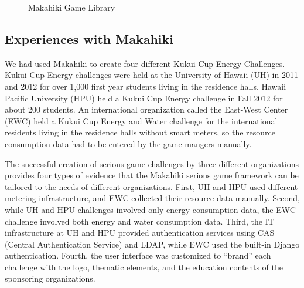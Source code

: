 \documentclass{sigchi}
\begin{document}
\begin{figure}
	\center
		\caption{Makahiki Game Library}
		\label{fig:makahiki-games}
\end{figure}

\subsection{Experiences with Makahiki}

We had used Makahiki to create four different Kukui
Cup Energy Challenges. Kukui Cup Energy challenges were held at the
University of Hawaii (UH) in 2011 and 2012 for over 1,000 first
year students living in the residence halls. Hawaii Pacific University
(HPU) held a Kukui Cup Energy challenge in Fall 2012 for about 200
students. An international organization called the East-West Center
(EWC) held a Kukui Cup Energy and Water challenge for the
international residents living in the residence halls without smart
meters, so the resource consumption data had to be entered by the game
mangers manually.

The successful creation of serious game challenges by three different organizations
provides four types of evidence that the Makahiki serious game framework can be tailored
to the needs of different organizations. First, UH and HPU used different metering
infrastructure, and EWC collected their resource data manually.  Second, while UH and HPU
challenges involved only energy consumption data, the EWC challenge involved both energy
and water consumption data. Third, the IT infrastructure at UH and HPU provided
authentication services using CAS (Central Authentication Service) and LDAP, while EWC
used the built-in Django authentication.  Fourth, the user interface was customized to
``brand'' each challenge with the logo, thematic elements, and the education contents of
the sponsoring organizations.
\end{document}
